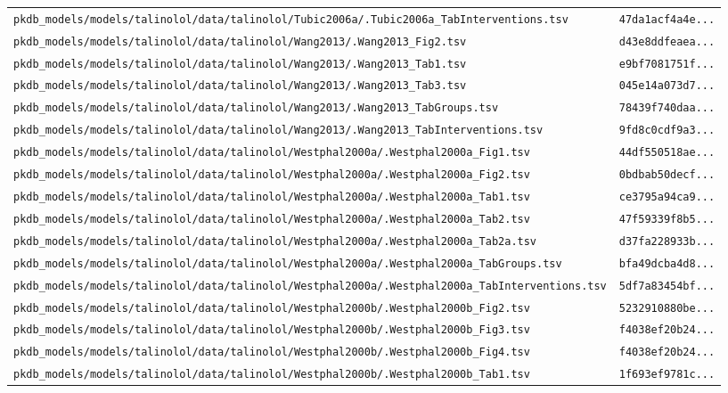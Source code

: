 \begin{longtable}{ll}
\texttt{pkdb\_models/models/talinolol/data/talinolol/Tubic2006a/.Tubic2006a\_TabInterventions.tsv} & \texttt{47da1acf4a4e...} \\
\texttt{pkdb\_models/models/talinolol/data/talinolol/Wang2013/.Wang2013\_Fig2.tsv} & \texttt{d43e8ddfeaea...} \\
\texttt{pkdb\_models/models/talinolol/data/talinolol/Wang2013/.Wang2013\_Tab1.tsv} & \texttt{e9bf7081751f...} \\
\texttt{pkdb\_models/models/talinolol/data/talinolol/Wang2013/.Wang2013\_Tab3.tsv} & \texttt{045e14a073d7...} \\
\texttt{pkdb\_models/models/talinolol/data/talinolol/Wang2013/.Wang2013\_TabGroups.tsv} & \texttt{78439f740daa...} \\
\texttt{pkdb\_models/models/talinolol/data/talinolol/Wang2013/.Wang2013\_TabInterventions.tsv} & \texttt{9fd8c0cdf9a3...} \\
\texttt{pkdb\_models/models/talinolol/data/talinolol/Westphal2000a/.Westphal2000a\_Fig1.tsv} & \texttt{44df550518ae...} \\
\texttt{pkdb\_models/models/talinolol/data/talinolol/Westphal2000a/.Westphal2000a\_Fig2.tsv} & \texttt{0bdbab50decf...} \\
\texttt{pkdb\_models/models/talinolol/data/talinolol/Westphal2000a/.Westphal2000a\_Tab1.tsv} & \texttt{ce3795a94ca9...} \\
\texttt{pkdb\_models/models/talinolol/data/talinolol/Westphal2000a/.Westphal2000a\_Tab2.tsv} & \texttt{47f59339f8b5...} \\
\texttt{pkdb\_models/models/talinolol/data/talinolol/Westphal2000a/.Westphal2000a\_Tab2a.tsv} & \texttt{d37fa228933b...} \\
\texttt{pkdb\_models/models/talinolol/data/talinolol/Westphal2000a/.Westphal2000a\_TabGroups.tsv} & \texttt{bfa49dcba4d8...} \\
\texttt{pkdb\_models/models/talinolol/data/talinolol/Westphal2000a/.Westphal2000a\_TabInterventions.tsv} & \texttt{5df7a83454bf...} \\
\texttt{pkdb\_models/models/talinolol/data/talinolol/Westphal2000b/.Westphal2000b\_Fig2.tsv} & \texttt{5232910880be...} \\
\texttt{pkdb\_models/models/talinolol/data/talinolol/Westphal2000b/.Westphal2000b\_Fig3.tsv} & \texttt{f4038ef20b24...} \\
\texttt{pkdb\_models/models/talinolol/data/talinolol/Westphal2000b/.Westphal2000b\_Fig4.tsv} & \texttt{f4038ef20b24...} \\
\texttt{pkdb\_models/models/talinolol/data/talinolol/Westphal2000b/.Westphal2000b\_Tab1.tsv} & \texttt{1f693ef9781c...} \\

\end{longtable}
